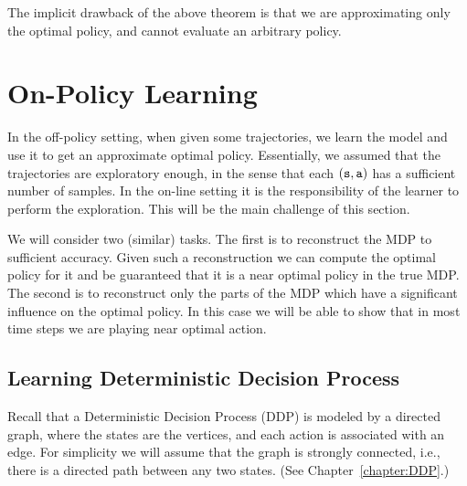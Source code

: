 The implicit drawback of the above theorem is that we are
approximating only the optimal policy, and cannot evaluate an
arbitrary policy.

\section{On-Policy Learning}


In the off-policy setting, when given some trajectories, we learn the model and use it to get an approximate optimal
policy. Essentially, we assumed that the trajectories are
exploratory enough, in the sense that each $({\tt s},{\tt a})$ has a
sufficient number of samples.
%
In the on-line setting it is the responsibility of the learner to
perform the exploration. This will be the main challenge of this section.

We will consider two (similar) tasks. The first is to reconstruct
the MDP to sufficient accuracy. Given such a reconstruction we can
compute the optimal policy for it and be guaranteed that it is a
near optimal policy in the true MDP. The second is to reconstruct
only the parts of the MDP which have a significant influence on the
optimal policy. In this case we will be able to show that in most
time steps we are playing near optimal action.

\subsection{Learning Deterministic Decision Process}

Recall that a Deterministic Decision Process (DDP) is modeled by a
directed graph, where the states are the vertices, and each action
is associated with an edge. For simplicity we will assume that the
graph is strongly connected, i.e., there is a directed path between
any two states. (See Chapter~\ref{chapter:DDP}.)

